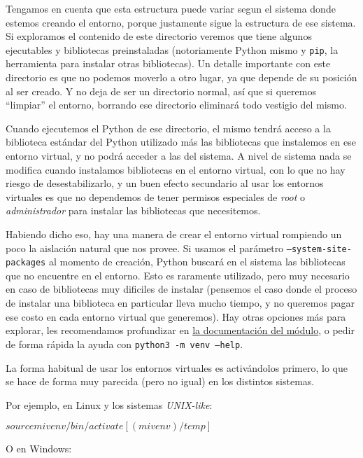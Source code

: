 Tengamos en cuenta que esta estructura puede variar segun el sistema donde estemos creando el entorno, porque justamente sigue la estructura de ese sistema. Si exploramos el contenido de este directorio veremos que tiene algunos ejecutables y bibliotecas preinstaladas (notoriamente Python mismo y \texttt{pip}, la herramienta para instalar otras bibliotecas). Un detalle importante con este directorio es que no podemos moverlo a otro lugar, ya que depende de su posición al ser creado. Y no deja de ser un directorio normal, así que si queremos ``limpiar'' el entorno, borrando ese directorio eliminará todo vestigio del mismo.

Cuando ejecutemos el Python de ese directorio, el mismo tendrá acceso a la biblioteca estándar del Python utilizado más las bibliotecas que instalemos en ese entorno virtual, y no podrá acceder a las del sistema. A nivel de sistema nada se modifica cuando instalamos bibliotecas en el entorno virtual, con lo que no hay riesgo de desestabilizarlo, y un buen efecto secundario al usar los entornos virtuales es que no dependemos de tener permisos especiales de \textit{root} o \textit{administrador} para instalar las bibliotecas que necesitemos.

Habiendo dicho eso, hay una manera de crear el entorno virtual rompiendo un poco la aislación natural que nos provee. Si usamos el parámetro \texttt{--system-site-packages} al momento de creación, Python buscará en el sistema las bibliotecas que no encuentre en el entorno. Esto es raramente utilizado, pero muy necesario en caso de bibliotecas muy dificiles de instalar (pensemos el caso donde el proceso de instalar una biblioteca en particular lleva mucho tiempo, y no queremos pagar ese costo en cada entorno virtual que generemos). Hay otras opciones más para explorar, les recomendamos profundizar en \href{https://docs.python.org/dev/library/venv.html}{la documentación del módulo}, o pedir de forma rápida la ayuda con \texttt{python3 -m venv --help}.

La forma habitual de usar los entornos virtuales es activándolos primero, lo que se hace de forma muy parecida (pero no igual) en los distintos sistemas.

Por ejemplo, en Linux y los sistemas \textit{UNIX-like}:

\begin{shell}
[/temp]$ source mivenv/bin/activate
[(mivenv) /temp]$ 
\end{shell}

O en Windows:

